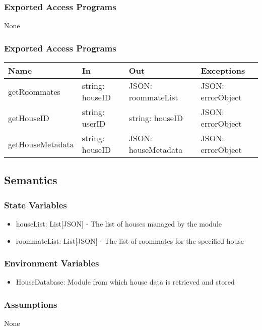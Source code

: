 \documentclass[12pt, titlepage]{article}
\begin{document}
\subsubsection{Exported Access Programs}
None

\subsubsection{Exported Access Programs}

\begin{center}
\begin{tabular}{p{3cm} p{4cm} p{5cm} p{3.5cm}}
\hline
\textbf{Name} & \textbf{In} & \textbf{Out} & \textbf{Exceptions} \\
\hline
getRoommates & string: houseID & JSON: roommateList & JSON: errorObject \\
getHouseID & string: userID & string: houseID & JSON: errorObject \\
getHouseMetadata & string: houseID & JSON: houseMetadata & JSON: errorObject \\
\hline
\end{tabular}
\end{center}

\subsection{Semantics}

\subsubsection{State Variables}
\begin{itemize}
  \item houseList: List[JSON] - The list of houses managed by the module
  \item roommateList: List[JSON] - The list of roommates for the specified house
\end{itemize}

\subsubsection{Environment Variables}

\begin{itemize}
  \item HouseDatabase: Module from which house data is retrieved and stored
\end{itemize}

\subsubsection{Assumptions}
None
\end{document}
